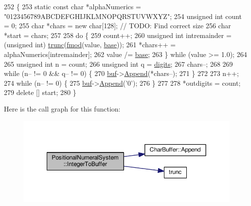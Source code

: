 \begin{DoxyCode}
252 \{
253     \textcolor{keyword}{static} \textcolor{keyword}{const} \textcolor{keywordtype}{char} *alphaNumerics = \textcolor{stringliteral}{"0123456789ABCDEFGHIJKLMNOPQRSTUVWXYZ"};
254     \textcolor{keywordtype}{unsigned} \textcolor{keywordtype}{int} count = 0;
255     \textcolor{keywordtype}{char} *chars = \textcolor{keyword}{new} \textcolor{keywordtype}{char}[128]; \textcolor{comment}{// TODO: Find correct size}
256     \textcolor{keywordtype}{char} *start = chars;
257 
258     \textcolor{keywordflow}{do} \{
259         count++;
260         \textcolor{keywordtype}{unsigned} \textcolor{keywordtype}{int} intremainder = (\textcolor{keywordtype}{unsigned} int) \hyperlink{math_8h_a82a151adfde56b28fa8a50355c4f2ff6}{trunc}(\hyperlink{math_8h_a537296d1a8f9fb621676038b99ba7edf}{fmod}(value, 
      \hyperlink{classPositionalNumeralSystem_a50cd19222978e16cc9c8b481c72c4662}{base}));
261         *chars++ = alphaNumerics[intremainder];
262         value /= \hyperlink{classPositionalNumeralSystem_a50cd19222978e16cc9c8b481c72c4662}{base};
263     \} \textcolor{keywordflow}{while} (value >= 1.0);
264 
265     \textcolor{keywordtype}{unsigned} \textcolor{keywordtype}{int} n = count;
266     \textcolor{keywordtype}{unsigned} \textcolor{keywordtype}{int} q = \hyperlink{classPositionalNumeralSystem_a0a9e8e3f5d46e3c12dd3fc994ed2c1e6}{digits};
267     chars--;
268 
269     \textcolor{keywordflow}{while} (n-- != 0 && q-- != 0) \{
270         \hyperlink{classNumeralSystem_a03e7be944bf3fa5e4c34d80f135cd017}{buf}->\hyperlink{classCharBuffer_a045b38735f7b3007c1b98d3d7b7feafe}{Append}(*chars--);
271     \}
272 
273     n++;
274     \textcolor{keywordflow}{while} (n-- != 0) \{
275         \hyperlink{classNumeralSystem_a03e7be944bf3fa5e4c34d80f135cd017}{buf}->\hyperlink{classCharBuffer_a045b38735f7b3007c1b98d3d7b7feafe}{Append}(\textcolor{charliteral}{'0'});
276     \}
277 
278     *outdigits = count;
279     \textcolor{keyword}{delete} [] start;
280 \}
\end{DoxyCode}


Here is the call graph for this function\+:
\nopagebreak
\begin{figure}[H]
\begin{center}
\leavevmode
\includegraphics[width=349pt]{d6/ddc/classPositionalNumeralSystem_ac2edd0c7d5b47dc04908038f3eb03556_cgraph}
\end{center}
\end{figure}




